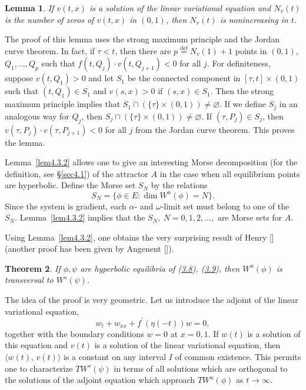 \documentclass{surv-l}
\theoremstyle{plain}
\newtheorem{theorem}{Theorem}[section]
\newtheorem{lemma}[theorem]{Lemma}
\theoremstyle{definition}
\numberwithin{equation}{section}
\numberwithin{figure}{chapter}
\begin{document}
\begin{lemma}\label{lem4.3.3} If $v(t, x)$ is a solution of the linear variational equation and $N_{v}(t)$ is the number of zeros of $v(t, x)$ in $(0,1)$, then $N_{v}(t)$ is nonincreasing in $t$.
\end{lemma}

The proof of this lemma uses the strong maximum principle and the Jordan curve theorem. In fact, if $\tau<t$, then there are $p\overset{\mathrm{def}}{=}N_{v}(1)+1$ points in $(0,1)$, $Q_{1}, \ldots, Q_{p}$ such that $f(t, Q_{j})\cdot v(t, Q_{j+1})<0$ for all $j$. For definiteness, suppose $v(t, Q_{1})>0$ and let $S_{1}$ be the connected component in $[\tau, t]\times(0,1)$ such that $(t, Q_{1})\in S_{1}$ and $v(s, x)>0$ if $(s, x)\in S_{1}$. Then the strong maximum principle implies that $ S_{1}\cap(\{\tau\}\times(0, 1))\neq\varnothing$. If we define $S_{j}$ in an analogous way for $Q_{j}$, then $ S_{j}\cap(\{\tau\}\times(0,1))\neq\varnothing$. If $(\tau, P_{j})\in S_{j}$, then $v(\tau, P_{j})\cdot v(\tau, P_{j+1})<0$ for all $j$ from the Jordan curve theorem. This proves the lemma.


Lemma~\ref{lem4.3.2} allows one to give an interesting Morse decomposition (for the definition, see \S \ref{sec4.1}) of the attractor $A$ in the case when all equilibrium points are hyperbolic. Define the Morse set $S_{N}$ by the relations
\begin{equation*}
S_{N}=\{\phi\in E\!:\dim W^{u}(\phi)=N\}.
\end{equation*}
Since the system is gradient, each $\alpha$- and $\omega$-limit set must belong to one of the $S_{N}$. Lemma~\ref{lem4.3.2} implies that the $S_{N},\ N=0,1,2,\ldots,$ are Morse sets for $A$.

Using Lemma~\ref{lem4.3.2}, one obtains the very surprising result of Henry [\citeyear{1985henry}] (another proof has been given by Angenent [\citeyear{1986a}]).

\begin{theorem}\label{thm4.3.4} If $\phi, \psi$ are hyperbolic equilibria of \emph{(\hyperref[chap04:eq3.8a]{3.8})}, \emph{(\hyperref[chap04:eq3.9]{3.9})}, then $W^{u}(\phi)$ is transversal to $W^{s}(\psi)$.
\end{theorem}

The idea of the proof is very geometric. Let us introduce the adjoint of the linear variational equation,
\begin{equation*}
w_{t}+w_{xx}+f^{\prime}(\eta(-t))w=0,
\end{equation*}
together with the boundary conditions $w=0$ at $x=0,1$. If $w(t)$ is a solution of this equation and $v(t)$ is a solution of the linear variational equation, then $\langle w(t)$, $ v(t)\rangle$ is a constant on any interval $I$ of common existence. This permits one to characterize $TW^{s}(\psi)$ in terms of all solutions which are orthogonal to the solutions of the adjoint equation which approach $TW^{u}(\phi)$ as $ t\rightarrow\infty$.
\end{document}
